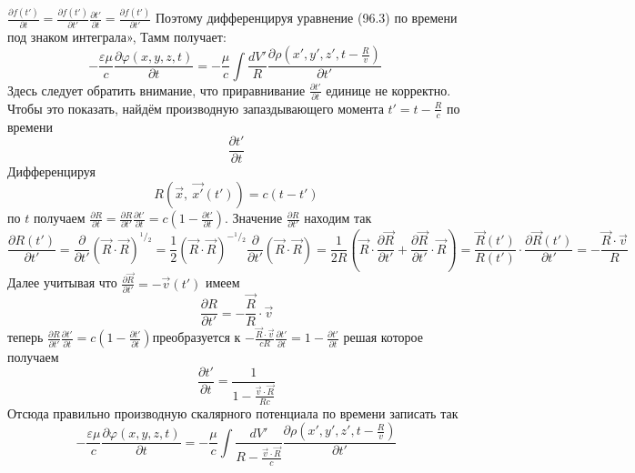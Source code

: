 \documentclass[11pt]{article}
\begin{document}
\(\frac{\partial f\left( t' \right)}{\partial t}=\frac{\partial f\left( t' \right)}{\partial t'}\frac{\partial t'}{\partial t}=\frac{\partial f\left( t' \right)}{\partial t'}\)
Поэтому дифференцируя уравнение (96.3) по времени под знаком интеграла»,
Тамм получает:
\[-\frac{\varepsilon \mu }{c}\frac{\partial \varphi \left( x,y,z,t \right)}{\partial t}=-\frac{\mu }{c}\int{\frac{dV'}{R}\frac{\partial \rho \left( x',y',z',t-\frac{R}{v} \right)}{\partial t'}}\ \]
Здесь следует обратить внимание, что приравнивание
\(\frac{\partial t'}{\partial t}\) единице не корректно. Чтобы это
показать, найдём производную запаздывающего момента \(t'=t-\frac{R}{c}\)
по времени \[\frac{\partial t'}{\partial t}\] Дифференцируя
\[R\left( \overrightarrow{x},\ \overrightarrow{x'}\left( t' \right) \right)=c\left( t-t' \right)\]
по \(t\) получаем
\(\frac{\partial R}{\partial t}=\frac{\partial R}{\partial t'}\frac{\partial t'}{\partial t}=c\left( 1-\frac{\partial t'}{\partial t} \right)\).
Значение \(\frac{\partial R}{\partial t'}\) находим так
\[\frac{\partial R\left( t' \right)}{\partial t'}=\frac{\partial }{\partial t'}{{\left( \overrightarrow{R}\cdot \overrightarrow{R} \right)}^{{}^{1}/{}_{2}}}=\frac{1}{2}{{\left( \overrightarrow{R}\cdot \overrightarrow{R} \right)}^{-{}^{1}/{}_{2}}}\frac{\partial }{\partial t'}\left( \overrightarrow{R}\cdot \overrightarrow{R} \right)=\frac{1}{2R}\left( \overrightarrow{R}\cdot \frac{\partial \overrightarrow{R}}{\partial t'}+\frac{\partial \overrightarrow{R}}{\partial t'}\cdot \overrightarrow{R} \right)=\frac{\overrightarrow{R}\left( t' \right)}{R\left( t' \right)}\cdot \frac{\partial \overrightarrow{R}\left( t' \right)}{\partial t'}=-\frac{\overrightarrow{R}\cdot \overrightarrow{v}}{R}\]
Далее учитывая что
\(\frac{\partial \overrightarrow{R}}{\partial t'}=-\overrightarrow{v}\left( t' \right)\)
имеем
\[\frac{\partial R}{\partial t'}=-\frac{\overrightarrow{R}}{R}\cdot \overrightarrow{v}\]
теперь
\(\frac{\partial R}{\partial t'}\frac{\partial t'}{\partial t}=c\left( 1-\frac{\partial t'}{\partial t} \right)\)преобразуется
к
\(-\frac{\overrightarrow{R}\cdot \overrightarrow{v}}{cR}\frac{\partial t'}{\partial t}=1-\frac{\partial t'}{\partial t}\)
решая которое получаем
\[\frac{\partial t'}{\partial t}=\frac{1}{1-\frac{\overrightarrow{v}\cdot \overrightarrow{R}}{Rc}}\]
Отсюда правильно производную скалярного потенциала по времени записать
так
\[-\frac{\varepsilon \mu }{c}\frac{\partial \varphi \left( x,y,z,t \right)}{\partial t}=-\frac{\mu }{c}\int{\frac{dV'}{R-\frac{\overrightarrow{v}\cdot \overrightarrow{R}}{c}}\frac{\partial \rho \left( x',y',z',t-\frac{R}{v} \right)}{\partial t'}}\]
\end{document}
